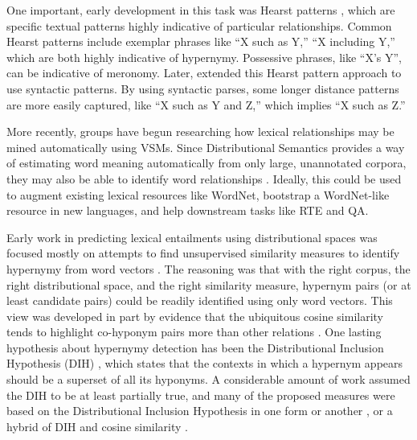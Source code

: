 One important, early development in this task was Hearst patterns
\cite{hearst:1992:coling}, which are specific textual patterns highly
indicative of particular relationships. Common Hearst patterns include
exemplar phrases like ``X such as Y,'' ``X including Y,'' which are both highly
indicative of hypernymy. Possessive phrases, like ``X's Y'', can be indicative
of meronomy. Later,
 extended this Hearst pattern approach
to use syntactic patterns. By using syntactic parses, some longer distance patterns
are more easily captured, like ``X such as Y and Z,'' which implies ``X such as Z.''

More recently, groups have begun researching how lexical relationships may be
mined automatically using VSMs. Since Distributional
Semantics provides a way of estimating word meaning automatically from only
large, unannotated corpora, they may also be able to identify
word relationships \cite{baroni:2011:gems,baroni:2012:eacl}. Ideally, this
could be used to augment existing lexical resources like WordNet, bootstrap
a WordNet-like resource in new languages, and help downstream tasks like RTE
and QA.

Early work in predicting lexical entailments using distributional spaces was
focused mostly on attempts to find unsupervised similarity measures to identify
hypernymy from word vectors
\cite{weeds:2004:coling,clarke:2009:gems,kotlerman:2010:nle,lenci:2012:starsem,santus:2013:thesis}.
The reasoning was that with the right corpus, the right
distributional space, and the right similarity measure, hypernym pairs
(or at least candidate pairs) could be readily identified using only word
vectors. This view was developed in part by evidence that the ubiquitous
cosine similarity tends to highlight co-hyponym pairs more than other relations
\cite{weeds:2004:coling,baroni:2011:gems}.  One lasting hypothesis about
hypernymy detection has been the Distributional Inclusion Hypothesis (DIH)
\cite{zhitomirskygeffet:2005:acl}, which states that the contexts in which a
hypernym appears should be a superset of all its hyponyms. A considerable
amount of work assumed the DIH to be at least partially true, and many of the
proposed measures were based on the Distributional Inclusion Hypothesis in one
form or another \cite{clarke:2009:gems}, or a hybrid of DIH and cosine
similarity \cite{kotlerman:2010:nle,lenci:2012:starsem}.

